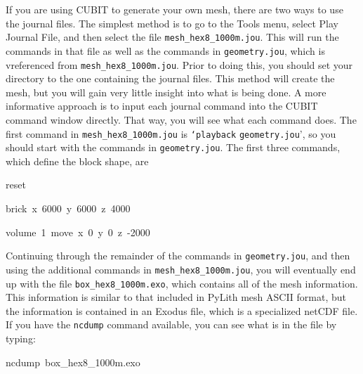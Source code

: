 If you are using CUBIT to generate your own mesh, there are two ways
to use the journal files. The simplest method is to go to the\textsf{
Tools} menu, select \textsf{Play Journal File}, and then select the
file \texttt{mesh\_hex8\_1000m.jou}. This will run the commands in
that file as well as the commands in \texttt{geometry.jou}, which
is vreferenced from \texttt{mesh\_hex8\_1000m.jou}. Prior to doing
this, you should set your directory to the one containing the journal
files. This method will create the mesh, but you will gain very little
insight into what is being done. A more informative approach is to
input each journal command into the CUBIT command window directly.
That way, you will see what each command does. The first command in
\texttt{mesh\_hex8\_1000m.jou} is \texttt{`playback} \texttt{geometry.jou}',
so you should start with the commands in \texttt{geometry.jou}. The
first three commands, which define the block shape, are
\begin{lyxcode}
reset

brick~x~6000~y~6000~z~4000

volume~1~move~x~0~y~0~z~-2000
\end{lyxcode}
Continuing through the remainder of the commands in \texttt{geometry.jou},
and then using the additional commands in \texttt{mesh\_hex8\_1000m.jou},
you will eventually end up with the file \texttt{box\_hex8\_1000m.exo},
which contains all of the mesh information. This information is similar
to that included in PyLith mesh ASCII format, but the information
is contained in an Exodus file, which is a specialized netCDF file.
If you have the \texttt{ncdump} command available, you can see what
is in the file by typing:
\begin{lyxcode}
ncdump~box\_hex8\_1000m.exo
\end{lyxcode}
